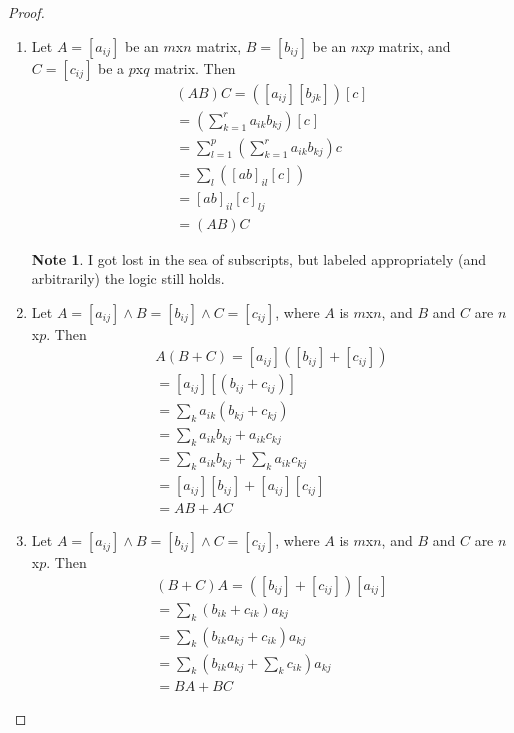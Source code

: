 \documentclass[11pt]{article}
\theoremstyle{definition}
\newtheorem{note}{Note}
\begin{document}
		\begin{shaded}
			\begin{proof}
				\begin{enumerate}[label=(\alph*)]
					\item Let $A = [a_{ij}]$ be an $m$x$n$ matrix, $B = [b_{ij}]$ be an $n$x$p$ matrix, and $C=[c_{ij}]$ be a $p$x$q$ matrix. Then
					\begin{align*}
						(AB)C = ([a_{ij}][b_{jk}])[c_{}] \\
						= (\sum\limits_{k=1}^{r} a_{ik}b_{kj})[c_{}] \\
						= \sum\limits_{l=1}^{p}(\sum\limits_{k=1}^{r} a_{ik}b_{kj})c_{} \\
						= \sum\limits_{l}([ab]_{il}[c]_{}) \\
						= [ab]_{il}[c]_{lj} \\
						= (AB)C
					\end{align*}
					
					\begin{note}
						I got lost in the sea of subscripts, but labeled appropriately (and arbitrarily) the logic still holds.
					\end{note}
					
					\item Let $A = [a_{ij}] \land B = [b_{ij}] \land C = [c_{ij}]$, where $A$ is $m$x$n$, and $B$ and $C$ are $n$x$p$. Then
					\begin{align*}
						A(B+C) = [a_{ij}]([b_{ij}] + [c_{ij}]) \\
						= [a_{ij}][(b_{ij} + c_{ij})] \\
						= \sum\limits_{k}a_{ik}(b_{kj}+c_{kj}) \\
						= \sum\limits_{k}a_{ik}b_{kj} + a_{ik}c_{kj} \\
						= \sum\limits_{k}a_{ik}b_{kj} + \sum\limits_{k}a_{ik}c_{kj} \\
						= [a_{ij}][b_{ij}] + [a_{ij}][c_{ij}] \\
						= AB + AC
					\end{align*} 
					
					\item Let $A = [a_{ij}] \land B = [b_{ij}] \land C = [c_{ij}]$, where $A$ is $m$x$n$, and $B$ and $C$ are $n$x$p$. Then
					\begin{align*}
						(B+C)A = ([b_{ij}] + [c_{ij}])[a_{ij}] \\
						= \sum\limits_{k}(b_{ik} + c_{ik})a_{kj} \\
						= \sum\limits_{k}(b_{ik}a_{kj} + c_{ik})a_{kj} \\
						= \sum\limits_{k}(b_{ik}a_{kj} + \sum\limits_{k}c_{ik})a_{kj} \\
						= BA + BC
					\end{align*}
				\end{enumerate}
			\end{proof}
		\end{shaded}
	
\end{document}
